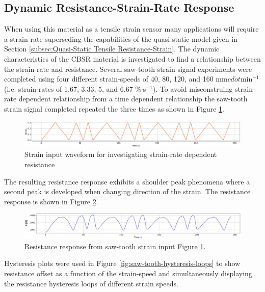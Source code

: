 \subsection{Dynamic Resistance-Strain-Rate Response}
When using this material as a tensile strain sensor many applications will require a strain-rate superseding the capabilities of the quasi-static model given in Section \ref{subsec:Quasi-Static Tensile Resistance-Strain}. The dynamic characteristics of the CBSR material is investigated to find a relationship between the strain-rate and resistance. Several saw-tooth strain signal experiments were completed using four different strain-speeds of 40, 80, 120, and 160 mm$cdot$min$^{-1}$ (i.e. strain-rates of 1.67, 3.33, 5, and 6.67 \%$\cdot$s$^{-1}$). To avoid misconstruing strain-rate dependent relationship from a time dependent relationship the saw-tooth strain signal completed repeated the three times as shown in Figure \ref{fig:saw-tooth-diff-v}.
\begin{figure}[H]
	\centering
	\includegraphics[width=\linewidth]{Figures/saw_tooth_diff_speeds_strain_only.jpg}
	\caption{Strain input waveform for investigating strain-rate dependent resistance}
	\label{fig:saw-tooth-diff-v}
\end{figure}
The resulting resistance response exhibits a shoulder peak phenomena where a second peak is developed when changing direction of the strain. The resistance response is shown in Figure \ref{fig:saw-tooth-res-response}.
\begin{figure}[H]
	\centering
	\includegraphics[width=\linewidth]{Figures/saw_tooth_diff_speeds_res_only.jpg}
	\caption{Resistance response from saw-tooth strain input Figure \ref{fig:saw-tooth-diff-v}.}
	\label{fig:saw-tooth-res-response}
\end{figure}
Hysteresis plots were used in Figure \ref{fig:saw-tooth-hysteresis-loops} to show resistance offset as a function of the strain-speed and simultaneously displaying the resistance hysteresis loops of different strain speeds. 
